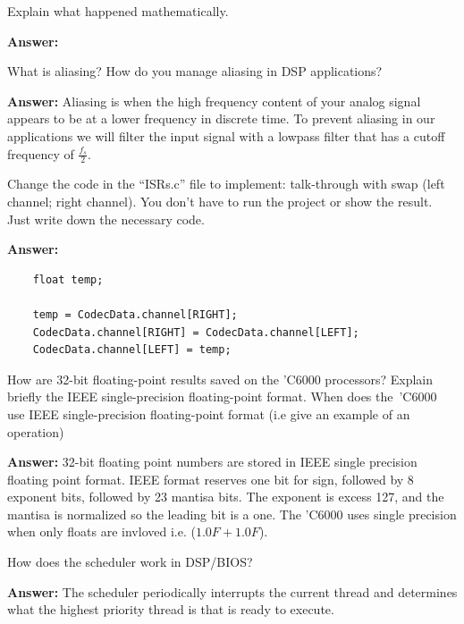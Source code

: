 \documentclass{article}
\begin{document}
\begin{enumerate}
  \begin{item}
    Explain what happened mathematically.

  \textbf{Answer:}

  \end{item}

  \begin{item}
    What is aliasing? How do you manage aliasing in DSP applications?

  \textbf{Answer:}
    Aliasing is when the high frequency content of your analog signal appears to be at a lower frequency in discrete time.
    To prevent aliasing in our applications we will filter the input signal with a lowpass filter that has a cutoff frequency of $\frac{f_s}{2}$.
  \end{item}

  \begin{item}
    Change the code in the “ISRs.c” file to implement: talk-through with swap (left channel; right channel). You don’t have to run the project or show the result. Just write down the necessary code.

  \textbf{Answer:}
    \begin{verbatim}
    float temp;

    temp = CodecData.channel[RIGHT];
    CodecData.channel[RIGHT] = CodecData.channel[LEFT];
    CodecData.channel[LEFT] = temp;
    \end{verbatim}
  \end{item}

  \begin{item}
    How are 32-bit floating-point results saved on the 'C6000 processors? Explain briefly the IEEE single-precision floating-point format. When does the 'C6000 use IEEE single-precision floating-point format (i.e give an example of an operation)

  \textbf{Answer:}
    32-bit floating point numbers are stored in IEEE single precision floating point format.
    IEEE format reserves one bit for sign, followed by 8 exponent bits, followed by 23 mantisa bits.
    The exponent is excess 127, and the mantisa is normalized so the leading bit is a one.
    The 'C6000 uses single precision when only floats are invloved i.e. ($1.0F + 1.0F$).
  \end{item}

  \begin{item}
    How does the scheduler work in DSP/BIOS?

  \textbf{Answer:}
    The scheduler periodically interrupts the current thread and determines what the highest priority thread is that is ready to execute.
  \end{item}


\end{enumerate}
\end{document}
